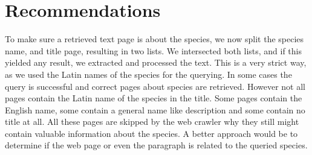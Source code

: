 \documentclass[a4paper, 12pt, oneside]{book} %
\begin{document}
\newpage
\section{Recommendations}
To make sure a retrieved text page is about the species, we now split the species name, and title page, resulting in two lists. 
We intersected both lists, and if this yielded any result, we extracted and processed the text.
This is a very strict way, as we used the Latin names of the species for the querying.
In some cases the query is successful and correct pages about species are retrieved.
However not all pages contain the Latin name of the species in the title.
Some pages contain the English name, some contain a general name like description and some contain no title at all. 
All these pages are skipped by the web crawler why they still might contain valuable information about the species.
A better approach would be to determine if the web page or even the paragraph is related to the queried species.


\printbibliography
\end{document}
